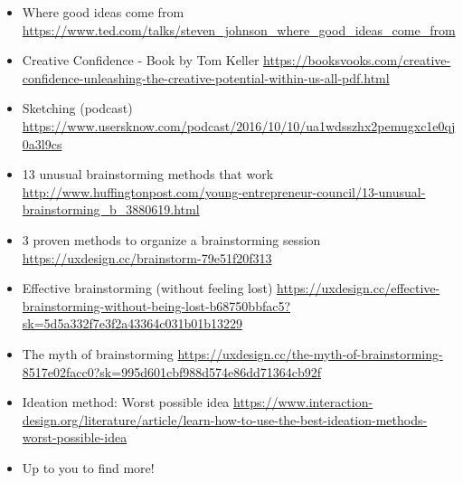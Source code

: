 \begin{itemize}
\item Where good ideas come from \url{https://www.ted.com/talks/steven_johnson_where_good_ideas_come_from}
\item Creative Confidence - Book by Tom Keller \url{https://booksvooks.com/creative-confidence-unleashing-the-creative-potential-within-us-all-pdf.html}
\item Sketching (podcast) \url{https://www.usersknow.com/podcast/2016/10/10/ua1wdsszhx2pemugxc1e0qj0a3l9cs}
\item 13 unusual brainstorming methods that work \url{http://www.huffingtonpost.com/young-entrepreneur-council/13-unusual-brainstorming_b_3880619.html}
\item 3 proven methods to organize a brainstorming session \url{https://uxdesign.cc/brainstorm-79e51f20f313}
\item Effective brainstorming (without feeling lost) \url{https://uxdesign.cc/effective-brainstorming-without-being-lost-b68750bbfac5?sk=5d5a332f7e3f2a43364c031b01b13229}
\item The myth of brainstorming \url{https://uxdesign.cc/the-myth-of-brainstorming-8517e02facc0?sk=995d601cbf988d574e86dd71364cb92f}
\item Ideation method: Worst possible idea \url{https://www.interaction-design.org/literature/article/learn-how-to-use-the-best-ideation-methods-worst-possible-idea}
\item Up to you to find more!
\end{itemize}

